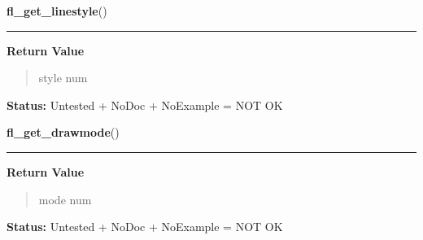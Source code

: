     \vspace{0.5ex}

\hspace{.8\funcindent}\begin{boxedminipage}{\funcwidth}

    \raggedright \textbf{fl\_get\_linestyle}()

    \vspace{-1.5ex}

    \rule{\textwidth}{0.5\fboxrule}
\setlength{\parskip}{2ex}
\setlength{\parskip}{1ex}
      \textbf{Return Value}
    \vspace{-1ex}

      \begin{quote}
      style num

      \end{quote}

\textbf{Status:} Untested + NoDoc + NoExample = NOT OK



    \end{boxedminipage}

    \label{xformslib:library:fl_get_drawmode}

    \vspace{0.5ex}

\hspace{.8\funcindent}\begin{boxedminipage}{\funcwidth}

    \raggedright \textbf{fl\_get\_drawmode}()

    \vspace{-1.5ex}

    \rule{\textwidth}{0.5\fboxrule}
\setlength{\parskip}{2ex}
\setlength{\parskip}{1ex}
      \textbf{Return Value}
    \vspace{-1ex}

      \begin{quote}
      mode num

      \end{quote}

\textbf{Status:} Untested + NoDoc + NoExample = NOT OK



    \end{boxedminipage}

    \label{xformslib:library:fl_linewidth}


